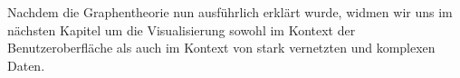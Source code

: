 Nachdem die Graphentheorie nun ausführlich erklärt wurde, widmen wir uns im nächsten Kapitel um die Visualisierung sowohl im Kontext der Benutzeroberfläche als auch im Kontext von stark vernetzten und komplexen Daten.